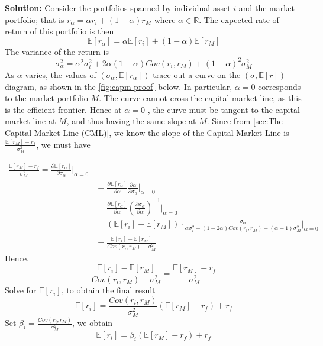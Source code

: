 \documentclass[13pt]{article}
\theoremstyle{definition}
\newenvironment{solution}
{\color{C2}\begin{framed}\begingroup\textbf{Solution:} }
  {\endgroup\end{framed}}
\theoremstyle{remark}
\newcommand{\EE}{\mathbb{E}}
\begin{document}
\begin{solution}
Consider the portfolios spanned by individual asset $i$ and the market portfolio; that is $r_{\alpha}=\alpha r_{i}+(1-\alpha) r_{M}$ where $\alpha \in \mathbb{R}$. The expected rate of return of this portfolio is then
$$
\EE[r_{\alpha}]=\alpha \EE[r_{i}]+(1-\alpha) \EE[r_{M}]
$$
The variance of the return is
$$
\sigma_{\alpha}^{2}=\alpha^{2} \sigma_{i}^{2}+2 \alpha(1-\alpha) Cov\left(r_{i}, r_{M}\right)+(1-\alpha)^{2} \sigma_{M}^{2}
$$
As $\alpha$ varies, the values of $\left(\sigma_{\alpha}, \EE[r_{\alpha}] \right)$ trace out a curve on the $\left(\sigma, \EE[r] \right)$ diagram, as shown in the \cref{fig:capm proof} below. In particular, $\alpha=0$ corresponds to the market portfolio $M$. The curve cannot cross the capital market line, as this is the efficient frontier. Hence at $\alpha=0$ , the curve must be tangent to the capital market line at $M$, and thus having the same slope at $M$. Since from \cref{sec:The Capital Market Line (CML)}, we know the slope of the Capital Market Line is $\frac{\EE[r_M]-r_{f}}{\sigma_{M}^{2}}$, we must have

\begin{align*}
    \frac{\EE[r_M]-r_{f}}{\sigma_{M}^{2}}=\frac{\partial \EE[r_{\alpha}]}{\partial \sigma_\alpha}\Big|_{\alpha=0}\\ &= \frac{\partial \EE[r_{\alpha}]}{\partial \alpha}\frac{\partial \alpha}{\partial \sigma_\alpha}\Big|_{\alpha=0}\\
    &= \frac{\partial \EE[r_{\alpha}]}{\partial \alpha}\left(\frac{\partial \sigma_\alpha}{\partial \alpha}\right)^{-1}\Big|_{\alpha=0}\\
    &= \left(\EE[r_{i}]-\EE[r_{M}]\right)\cdot \frac{\sigma_\alpha}{\alpha \sigma_{i}^{2}+(1-2\alpha) Cov\left(r_{i}, r_{M}\right)+(\alpha-1) \sigma_{M}^{2}}\Big|_{\alpha=0}\\
    &=\frac{\EE[r_i]-\EE[r_M]}{Cov\left(r_{i}, r_{M}\right)-\sigma_{M}^{2}}
\end{align*}
Hence,
$$
\frac{\EE[r_i]-\EE[r_M]}{Cov\left(r_{i}, r_{M}\right)-\sigma_{M}^{2}}=\frac{\EE[r_M]-r_{f}}{\sigma_{M}^{2}}
$$
Solve for $\EE[r_i]$, to obtain the final result
$$
\EE[r_i] =\frac{Cov\left(r_{i}, r_{M}\right)}{\sigma_{M}^{2}}\left(\EE[r_M]-r_{f}\right) +r_{f}
$$
Set $\beta_i=\frac{Cov\left(r_{i}, r_{M}\right)}{\sigma_{M}^{2}}$, we obtain
$$
\EE[r_i]=\beta_{i}\left(\EE[r_M]-r_{f}\right) +r_{f}
$$
\end{solution}
\end{document}
